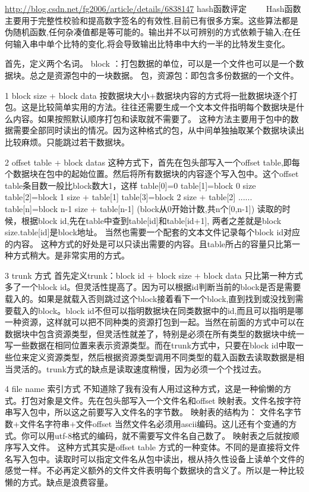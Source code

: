 \url{http://blog.csdn.net/fg2006/article/details/6838147} hash函数评定
　　Hash函数主要用于完整性校验和提高数字签名的有效性,目前已有很多方案。这些算法都是伪随机函数,任何杂凑值都是等可能的。输出并不以可辨别的方式依赖于输入;在任何输入串中单个比特的变化,将会导致输出比特串中大约一半的比特发生变化。 

首先，定义两个名词。
block ：打包数据的单位，可以是一个文件也可以是一个数据块。总之是资源包中的一块数据。
包，资源包：即包含多份数据的一个文件。

1 block size + block data 
按数据块大小+数据块内容的方式将一批数据块逐个打包。这是比较简单实用的方法。往往还需要生成一个文本文件指明每个数据块是什么内容。如果按照默认顺序打包和读取就不需要了。
这种方法主要用于包中的数据需要全部同时读出的情况。因为这种格式的包，从中间单独抽取某个数据块读出比较麻烦。只能跳过若干数据块。

2 offset table + block datas
这种方式下，首先在包头部写入一个offset table,即每个数据块在包中的起始位置。然后将所有数据块的内容逐个写入包中。这个offset table条目数一般比block数大1，这样
table[0]=0
table[1]=block 0 size
table[2]=block 1 size + table[1]
table[3]=block 2 size + table[2]
......
    table[n]=block n-1 size + table[n-1]
(block从0开始计数,共n个[0,n-1])
    读取的时候，根据block id,先在table中查到table[id]和table[id+1], 两者之差就是block size.table[id]是block地址。
    当然也需要一个配套的文本文件记录每个block id对应的内容。
    这种方式的好处是可以只读出需要的内容。且table所占的容量只比第一种方式稍大。是非常实用的方式。

    3 trunk 方式
    首先定义trunk：block id + block size + block data
    只比第一种方式多了一个block id。但灵活性提高了。因为可以根据id判断当前的block是否是需要载入的。如果是就载入否则跳过这个block接着看下一个block,直到找到或没找到需要载入的block。block id不但可以指明数据块在同类数据中的id,而且可以指明是哪一种资源，这样就可以把不同种类的资源打包到一起。当然在前面的方式中可以在数据块中包含资源类型，但灵活性就差了，特别是必须在所有类型的数据块中统一写一些数据在相同位置来表示资源类型。而在trunk方式中，只要在block id中取一些位来定义资源类型，然后根据资源类型调用不同类型的载入函数去读取数据是相当灵活的。trunk方式的缺点是读取速度稍慢，因为必须一个个找过去。

    4 file name 索引方式
    不知道除了我有没有人用过这种方式，这是一种偷懒的方式。打包对象是文件。先在包头部写入一个文件名和offset 映射表。文件名按字符串写入包中，所以这之前要写入文件名的字节数。
    映射表的结构为： 文件名字节数+文件名字符串+文件offset
    当然文件名必须用ascii编码。这儿还有个变通的方式。你可以用utf-8格式的编码，就不需要写文件名自己数了。
    映射表之后就按顺序写入文件。
    这种方式其实是offset table 方式的一种变体。不同的是直接将文件名写入包中。读取时可以指定文件名从包中读出，根从持久性设备上读单个文件的感觉一样。不必再定义额外的文件文件表明每个数据块的含义了。所以是一种比较懒的方式。缺点是浪费容量。

